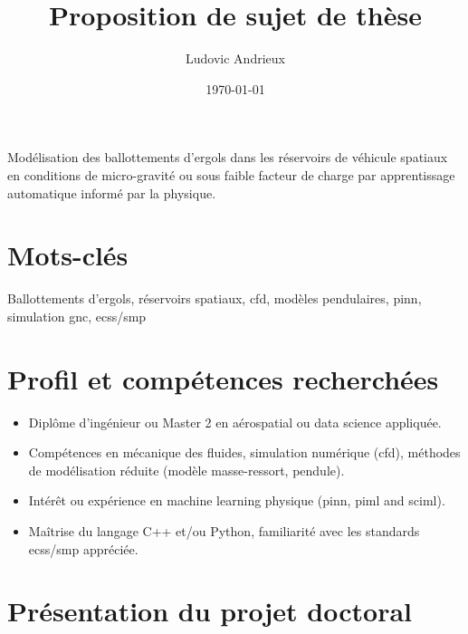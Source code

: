 \documentclass[12pt]{article}
\title{Proposition de sujet de thèse}
\author{Ludovic Andrieux}
\date{\today}
\begin{document}
	\maketitle
	
	\begin{tcolorbox}[colback=gray!0, colframe=black, sharp corners, boxrule=0.5pt]
	Modélisation des ballottements d’ergols dans les réservoirs de véhicule spatiaux en conditions de micro-gravité ou sous faible facteur de charge par apprentissage automatique informé par la physique.
	\end{tcolorbox}
	
	\section*{Mots-clés}
	
	Ballottements d'ergols, réservoirs spatiaux, \acrshort{cfd}, modèles pendulaires, \acrshort{pinn}, simulation \acrshort{gnc}, \acrshort{ecss}/\acrshort{smp}
	
	\section*{Profil et compétences recherchées}
	
	\begin{itemize}
		\item Diplôme d’ingénieur ou Master 2 en aérospatial ou data science appliquée.
		
		\item Compétences en mécanique des fluides, simulation numérique (\acrshort{cfd}), méthodes de modélisation réduite (modèle masse-ressort, pendule).
		
		\item Intérêt ou expérience en machine learning physique (\acrshort{pinn}, \acrshort{piml} and \acrshort{sciml}).
		
		\item Maîtrise du langage C++ et/ou Python, familiarité avec les standards \acrshort{ecss}/\acrshort{smp} appréciée.
	\end{itemize}
	
	
	\section*{Présentation du projet doctoral}
	
\end{document}
